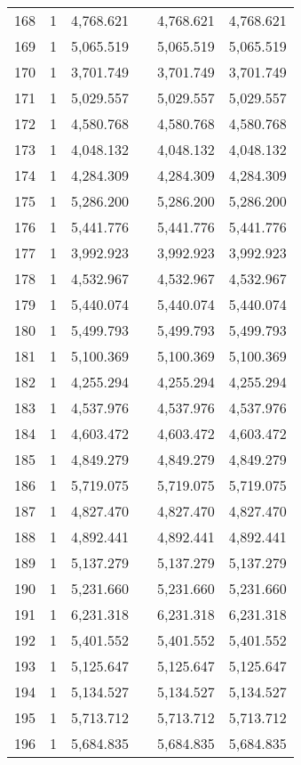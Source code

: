 \begin{table}[!htbp]
\begin{tabular}{@{\extracolsep{5pt}}lccccc}
168 & 1 & 4,768.621 &  & 4,768.621 & 4,768.621 \\ 
169 & 1 & 5,065.519 &  & 5,065.519 & 5,065.519 \\ 
170 & 1 & 3,701.749 &  & 3,701.749 & 3,701.749 \\ 
171 & 1 & 5,029.557 &  & 5,029.557 & 5,029.557 \\ 
172 & 1 & 4,580.768 &  & 4,580.768 & 4,580.768 \\ 
173 & 1 & 4,048.132 &  & 4,048.132 & 4,048.132 \\ 
174 & 1 & 4,284.309 &  & 4,284.309 & 4,284.309 \\ 
175 & 1 & 5,286.200 &  & 5,286.200 & 5,286.200 \\ 
176 & 1 & 5,441.776 &  & 5,441.776 & 5,441.776 \\ 
177 & 1 & 3,992.923 &  & 3,992.923 & 3,992.923 \\ 
178 & 1 & 4,532.967 &  & 4,532.967 & 4,532.967 \\ 
179 & 1 & 5,440.074 &  & 5,440.074 & 5,440.074 \\ 
180 & 1 & 5,499.793 &  & 5,499.793 & 5,499.793 \\ 
181 & 1 & 5,100.369 &  & 5,100.369 & 5,100.369 \\ 
182 & 1 & 4,255.294 &  & 4,255.294 & 4,255.294 \\ 
183 & 1 & 4,537.976 &  & 4,537.976 & 4,537.976 \\ 
184 & 1 & 4,603.472 &  & 4,603.472 & 4,603.472 \\ 
185 & 1 & 4,849.279 &  & 4,849.279 & 4,849.279 \\ 
186 & 1 & 5,719.075 &  & 5,719.075 & 5,719.075 \\ 
187 & 1 & 4,827.470 &  & 4,827.470 & 4,827.470 \\ 
188 & 1 & 4,892.441 &  & 4,892.441 & 4,892.441 \\ 
189 & 1 & 5,137.279 &  & 5,137.279 & 5,137.279 \\ 
190 & 1 & 5,231.660 &  & 5,231.660 & 5,231.660 \\ 
191 & 1 & 6,231.318 &  & 6,231.318 & 6,231.318 \\ 
192 & 1 & 5,401.552 &  & 5,401.552 & 5,401.552 \\ 
193 & 1 & 5,125.647 &  & 5,125.647 & 5,125.647 \\ 
194 & 1 & 5,134.527 &  & 5,134.527 & 5,134.527 \\ 
195 & 1 & 5,713.712 &  & 5,713.712 & 5,713.712 \\ 
196 & 1 & 5,684.835 &  & 5,684.835 & 5,684.835 \\ 

\end{tabular}
\end{table}
